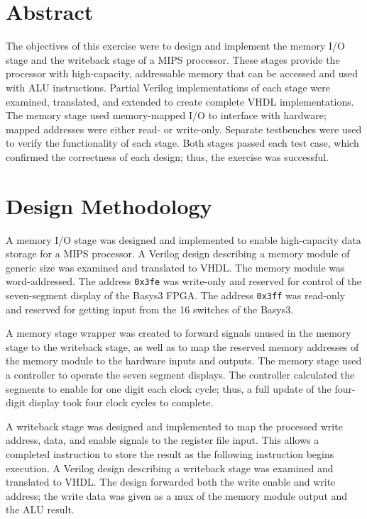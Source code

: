 \documentclass[CMPE]{KGCOEReport}
\begin{document}
\maketitle

\section*{Abstract}

The objectives of this exercise were to design and implement the memory I/O
stage and the writeback stage of a MIPS processor. These stages provide the
processor with high-capacity, addressable memory that can be accessed and used
with ALU instructions. Partial Verilog implementations of each stage were
examined, translated, and extended to create complete VHDL implementations. The
memory stage used memory-mapped I/O to interface with hardware; mapped
addresses were either read- or write-only. Separate testbenches were used to
verify the functionality of each stage. Both stages passed each test case,
which confirmed the correctness of each design; thus, the exercise was
successful.

\section*{Design Methodology}

A memory I/O stage was designed and implemented to enable high-capacity data
storage for a MIPS processor. A Verilog design describing a memory module of
generic size was examined and translated to VHDL. The memory module was
word-addressed. The address \texttt{0x3fe} was write-only and reserved for
control of the seven-segment display of the Basys3 FPGA. The address
\texttt{0x3ff} was read-only and reserved for getting input from the 16
switches of the Basys3.

A memory stage wrapper was created to forward signals unused in the memory
stage to the writeback stage, as well as to map the reserved memory addresses
of the memory module to the hardware inputs and outputs. The memory stage used
a controller to operate the seven segment displays. The controller calculated
the segments to enable for one digit each clock cycle; thus, a full update of
the four-digit display took four clock cycles to complete.

A writeback stage was designed and implemented to map the processed write
address, data, and enable signals to the register file input. This allows a
completed instruction to store the result as the following instruction begins
execution. A Verilog design describing a writeback stage was examined and
translated to VHDL. The design forwarded both the write enable and write
address; the write data was given as a mux of the memory module output and the
ALU result.
\end{document}

